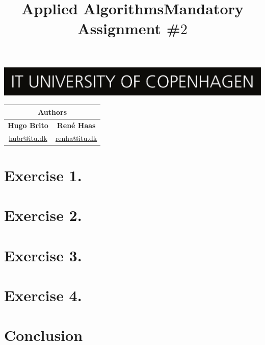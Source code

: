 \documentclass{tufte-handout}
\title{Applied Algorithms\newline Mandatory Assignment \#$2$}
\begin{document}
\thispagestyle{empty}

\maketitle
\includegraphics[width=\textwidth]{logo_en.png}

\vspace{10mm}\noindent %


\vspace{5mm}\noindent %

\begin{table}[!h]
\centering
\begin{tabular}{cc}
\multicolumn{2}{c}{Authors}                                   \\ \hline
\multicolumn{1}{c|}{\textbf{Hugo Brito}} & \textbf{René Haas} \\
\multicolumn{1}{c|}{\href{mailto:hubr@itu.dk}{hubr@itu.dk}}         & \href{mailto:renha@itu.dk}{renha@itu.dk}       \\ \hline
\end{tabular}
\end{table}

\vspace{5mm} %

\newpage

\section{\textbf{Exercise 1.}}

\section{\textbf{Exercise 2.}}

\section{\textbf{Exercise 3.}}

\section{\textbf{Exercise 4.}}

\section{Conclusion}
\end{document}
